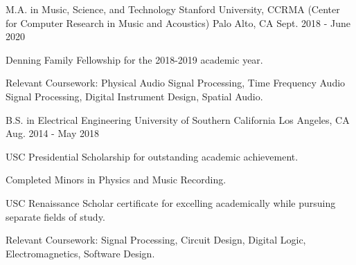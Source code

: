 

\begin{cventries}

    \cventry
    {M.A. in Music, Science, and Technology} %
    {Stanford University, CCRMA (Center for Computer Research in Music and Acoustics)} %
    {Palo Alto, CA} %
    {Sept. 2018 - June 2020} %
    {
      \begin{cvitems} %
        \item {Denning Family Fellowship for the 2018-2019 academic year.}
        \item {Relevant Coursework: Physical Audio Signal Processing, Time Frequency Audio Signal Processing, Digital Instrument Design, Spatial Audio.}
      \end{cvitems}
    }

    \cventry
    {B.S. in Electrical Engineering} %
    {University of Southern California} %
    {Los Angeles, CA} %
    {Aug. 2014 - May 2018} %
    {
      \begin{cvitems} %
        \item {USC Presidential Scholarship for outstanding academic achievement.}
        \item {Completed Minors in Physics and Music Recording.}
        \item {USC Renaissance Scholar certificate for excelling academically while pursuing separate fields of study.}
        \item {Relevant Coursework: Signal Processing, Circuit Design, Digital Logic, Electromagnetics, Software Design.}
      \end{cvitems}
    }

\end{cventries}
